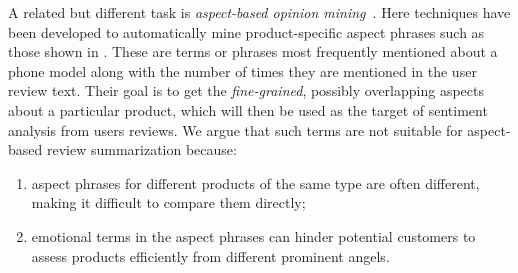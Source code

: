 A related but different task is \textit{aspect-based opinion 
mining}~\cite{su2008hidden,zeng2013classification}. 
Here techniques have been developed to automatically mine
product-specific aspect phrases such as those shown in 
.
{These are terms or phrases
most frequently mentioned about a phone model along with the number of
times they are mentioned in the user review text.} 
Their goal is to get the {\em fine-grained},
possibly overlapping aspects about a particular product,
which will then be used as the target of sentiment analysis from
users reviews.
We argue that such terms are not suitable for aspect-based review
summarization because: 
\begin{enumerate}
	\item aspect phrases for different products of the same type 
are often different, making it difficult to 
compare them directly; 
	\item  emotional terms in the aspect phrases can hinder potential customers to assess products efficiently from different prominent angels.  
\end{enumerate} 




